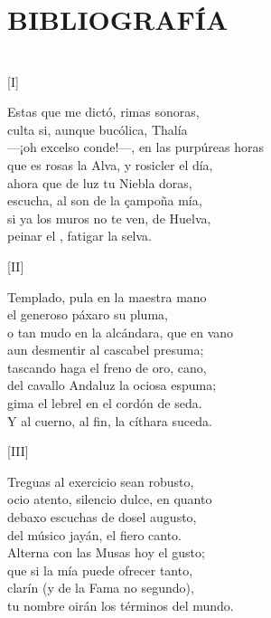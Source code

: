 \documentclass[11pt,a4paper,twoside]{article}
\begin{document}
\section*{\fontsize{13}{14.35}\selectfont BIBLIOGRAFÍA}
\nocite{*}
\printbibliography[heading=none]
\newpage

\section*{\centering \fontsize{11}{14.35}\selectfont[DEDICATORIA]}
\vspace{-1em}
\begin{center}
	[I]
\end{center}
\beginnumbering
\pstart
Estas que me dictó, rimas sonoras,\\
culta si, aunque bucólica, Thalía\\
—¡oh excelso conde!—, en las purpúreas horas\\
que es rosas la Alva, y rosicler el día,\\
ahora que de luz tu Niebla doras,\\
escucha, al son de la çampoña mía,\\
si ya los muros no te ven, de Huelva,\\
peinar el , fatigar la selva.\pend
\begin{center}
	[II]
\end{center}
\pstart
Templado, pula en la maestra mano\\
el generoso páxaro su pluma,\\
o tan mudo en la alcándara, que en vano\\
aun desmentir al cascabel presuma;\\
tascando haga el freno de oro, cano,\\
del cavallo Andaluz la ociosa espuma;\\
gima el lebrel en el cordón de seda.\\
Y al cuerno, al fin, la cíthara suceda.\pend
\begin{center}
	[III]
\end{center}
\pstart
Treguas al exercicio sean robusto,\\
ocio atento, silencio dulce, en quanto\\
debaxo escuchas de dosel augusto,\\
del músico jayán, el fiero canto.\\
Alterna con las Musas hoy el gusto;\\
que si la mía puede ofrecer tanto,\\
clarín (y de la Fama no segundo),\\
tu nombre oirán los términos del mundo.\pend
\end{document}
